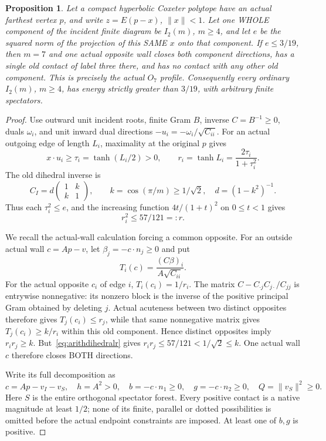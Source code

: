 \documentclass[11pt]{article}
\newtheorem{proposition}[theorem]{Proposition}
\begin{document}
\begin{proposition}\label{prop:ordinarydihedralthreenineteenths}
Let a compact hyperbolic Coxeter polytope have an actual farthest
vertex \(p\), and write \(z=E(p-x)\), \(\|x\|<1\).
Let one WHOLE component of the incident finite diagram be
\(I_2(m)\), \(m\ge4\), and let \(e\) be the squared norm of the
projection of this SAME \(x\) onto that component.
If \(e\le3/19\), then \(m=7\) and one actual opposite wall
closes both component directions, has a single old contact of
label three there, and has no contact with any other old component.
This is precisely the actual \(O_7\) profile.
Consequently every ordinary \(I_2(m)\), \(m\ge4\), has energy
strictly greater than \(3/19\), with arbitrary finite spectators.
\end{proposition}

\begin{proof}
Use outward unit incident roots, finite Gram \(B\), inverse
\(C=B^{-1}\ge0\), duals \(\omega_i\), and unit inward dual
directions \(-u_i=-\omega_i/\sqrt{C_{ii}}\).
For an actual outgoing edge of length \(L_i\), maximality at
the original \(p\) gives
\[
 x\cdot u_i\ge\tau_i=\tanh(L_i/2)>0,\qquad
 r_i=\tanh L_i={\frac{2\tau_i}{1+\tau_i^2}}.
\]
The old dihedral inverse is
\[
 C_I=d\begin{pmatrix}1&k\\k&1\end{pmatrix},\qquad
 k=\cos(\pi/m)\ge1/\sqrt2,\quad d=(1-k^2)^{-1}.
\]
Thus each \(\tau_i^2\le e\), and the increasing function
\(4t/(1+t)^2\) on \(0\le t<1\) gives
\[
                         r_i^2\le57/121=:r .
\tag{Dih1}\label{eq:arithdihedralr}
\]

We recall the actual-wall calculation forcing a common opposite.
For an outside actual wall \(c=Ap-v\), let
\(\beta_j=-c\cdot n_j\ge0\) and put
\[
 T_i(c)={\frac{(C\beta)_i}{A\sqrt{C_{ii}}}}.
\]
For the actual opposite \(c_i\) of edge \(i\),
\(T_i(c_i)=1/r_i\).
The matrix
\(C-C_{\cdot j}C_{j\cdot}/C_{jj}\)
is entrywise nonnegative: its nonzero block is the inverse of
the positive principal Gram obtained by deleting \(j\).
Actual acuteness between two distinct opposites therefore gives
\(T_j(c_i)\le r_j\), while that same nonnegative matrix gives
\(T_j(c_i)\ge k/r_i\) within this old component.
Hence distinct opposites imply \(r_ir_j\ge k\).
But~\eqref{eq:arithdihedralr} gives
\(r_ir_j\le57/121<1/\sqrt2\le k\).
One actual wall \(c\) therefore closes BOTH directions.

Write its full decomposition as
\[
 c=Ap-v_I-v_S,\quad h=A^2>0,\quad
 b=-c\cdot n_1\ge0,\quad g=-c\cdot n_2\ge0,\quad
 Q=\|v_S\|^2\ge0 .
\]
Here \(S\) is the entire orthogonal spectator forest.
Every positive contact is a native magnitude at least \(1/2\);
none of its finite, parallel or dotted possibilities is omitted
before the actual endpoint constraints are imposed.
At least one of \(b,g\) is positive.


\end{proof}
\end{document}
